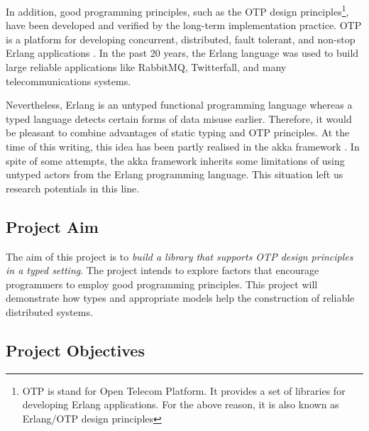 In addition, good programming principles, such as the OTP design principles\footnote{OTP is stand for Open Telecom Platform.  It provides a set of libraries for developing Erlang applications.  For the above reason, it is also known as Erlang/OTP design principles}, have been developed and verified by the long-term implementation practice.  OTP is a platform for developing concurrent, distributed, fault tolerant, and non-stop Erlang applications \cite{Erlang}.  In the past 20 years, the Erlang language was used to build large reliable applications like RabbitMQ, Twitterfall, and many telecommunications systems.

Nevertheless, Erlang is an untyped functional programming language whereas a typed language detects certain forms of data misuse earlier.  Therefore, it would be pleasant to combine advantages of static typing and OTP principles.  At the time of this writing, this idea has been partly realised in the akka framework \cite{akka}.  In spite of some attempts, the akka framework inherits some limitations of using untyped actors from the Erlang programming language.  This situation left us research potentials in this line.

\subsection{Project Aim}
\label{aim}
The aim of this project is to {\it{build a library that supports OTP design principles in a typed setting}}. The project intends to explore factors that encourage programmers to employ good programming principles.  This project will demonstrate how types and appropriate models help the construction of reliable distributed systems.

\subsection{Project Objectives}
\label{objectives}

